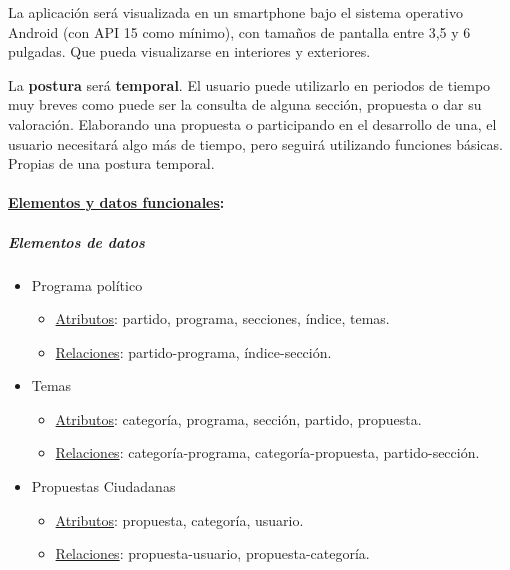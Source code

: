 La aplicación será visualizada en un smartphone bajo el sistema operativo Android (con API 15 como mínimo), con tamaños de pantalla entre 3,5 y 6 pulgadas. Que pueda visualizarse en interiores y exteriores.

La \textbf{postura} será \textbf{temporal}. El usuario puede utilizarlo en periodos de tiempo muy breves como puede ser la consulta de alguna sección, propuesta o dar su valoración. Elaborando una propuesta o participando en el desarrollo de una, el usuario necesitará algo más de tiempo, pero seguirá utilizando funciones básicas. Propias de una postura temporal.

\paragraph{\underline{Elementos y datos funcionales}:}

\subparagraph{Elementos de datos}

\begin{itemize}
 \item Programa político
 \begin{itemize}
  \item \underline{Atributos}: partido, programa, secciones, índice, temas.
  \item \underline{Relaciones}: partido-programa, índice-sección.
 \end{itemize}
\end{itemize}

\begin{itemize}
 \item Temas
 \begin{itemize}
  \item \underline{Atributos}: categoría, programa, sección, partido, propuesta.
  \item \underline{Relaciones}: categoría-programa, categoría-propuesta, partido-sección.
 \end{itemize}
\end{itemize}

\begin{itemize}
 \item Propuestas Ciudadanas
 \begin{itemize}
  \item \underline{Atributos}: propuesta, categoría, usuario.
  \item \underline{Relaciones}: propuesta-usuario, propuesta-categoría.
 \end{itemize}
\end{itemize}

